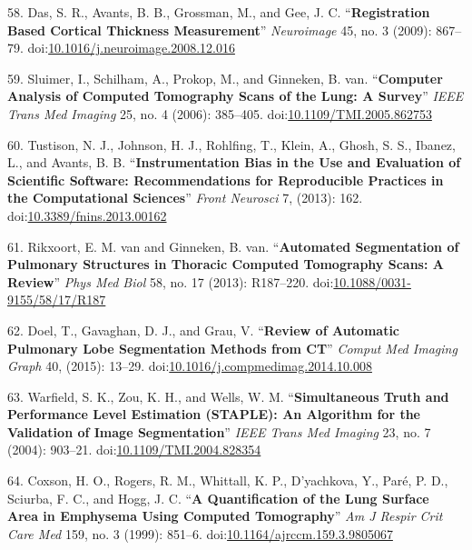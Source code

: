 \documentclass[11pt,]{article}
\begin{document}
\hypertarget{ref-Das:2009aa}{}
58. Das, S. R., Avants, B. B., Grossman, M., and Gee, J. C.
``\textbf{Registration Based Cortical Thickness Measurement}''
\emph{Neuroimage} 45, no. 3 (2009): 867--79.
doi:\href{https://doi.org/10.1016/j.neuroimage.2008.12.016}{10.1016/j.neuroimage.2008.12.016}

\hypertarget{ref-Sluimer:2006aa}{}
59. Sluimer, I., Schilham, A., Prokop, M., and Ginneken, B. van.
``\textbf{Computer Analysis of Computed Tomography Scans of the Lung: A
Survey}'' \emph{IEEE Trans Med Imaging} 25, no. 4 (2006): 385--405.
doi:\href{https://doi.org/10.1109/TMI.2005.862753}{10.1109/TMI.2005.862753}

\hypertarget{ref-Tustison:2013aa}{}
60. Tustison, N. J., Johnson, H. J., Rohlfing, T., Klein, A., Ghosh, S.
S., Ibanez, L., and Avants, B. B. ``\textbf{Instrumentation Bias in the
Use and Evaluation of Scientific Software: Recommendations for
Reproducible Practices in the Computational Sciences}'' \emph{Front
Neurosci} 7, (2013): 162.
doi:\href{https://doi.org/10.3389/fnins.2013.00162}{10.3389/fnins.2013.00162}

\hypertarget{ref-Rikxoort:2013aa}{}
61. Rikxoort, E. M. van and Ginneken, B. van. ``\textbf{Automated
Segmentation of Pulmonary Structures in Thoracic Computed Tomography
Scans: A Review}'' \emph{Phys Med Biol} 58, no. 17 (2013): R187--220.
doi:\href{https://doi.org/10.1088/0031-9155/58/17/R187}{10.1088/0031-9155/58/17/R187}

\hypertarget{ref-Doel:2015aa}{}
62. Doel, T., Gavaghan, D. J., and Grau, V. ``\textbf{Review of
Automatic Pulmonary Lobe Segmentation Methods from CT}'' \emph{Comput
Med Imaging Graph} 40, (2015): 13--29.
doi:\href{https://doi.org/10.1016/j.compmedimag.2014.10.008}{10.1016/j.compmedimag.2014.10.008}

\hypertarget{ref-Warfield:2004aa}{}
63. Warfield, S. K., Zou, K. H., and Wells, W. M. ``\textbf{Simultaneous
Truth and Performance Level Estimation (STAPLE): An Algorithm for the
Validation of Image Segmentation}'' \emph{IEEE Trans Med Imaging} 23,
no. 7 (2004): 903--21.
doi:\href{https://doi.org/10.1109/TMI.2004.828354}{10.1109/TMI.2004.828354}

\hypertarget{ref-Coxson:1999aa}{}
64. Coxson, H. O., Rogers, R. M., Whittall, K. P., D'yachkova, Y., Paré,
P. D., Sciurba, F. C., and Hogg, J. C. ``\textbf{A Quantification of the
Lung Surface Area in Emphysema Using Computed Tomography}'' \emph{Am J
Respir Crit Care Med} 159, no. 3 (1999): 851--6.
doi:\href{https://doi.org/10.1164/ajrccm.159.3.9805067}{10.1164/ajrccm.159.3.9805067}
\end{document}
